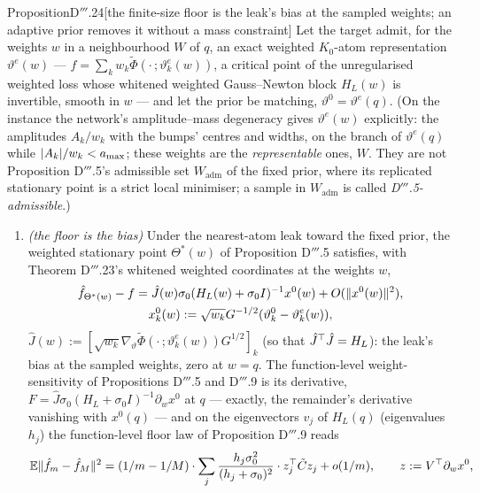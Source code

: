 \begin{thm}{Proposition}{D$'''$.24}[the finite-size floor is the leak's bias at the sampled weights; an adaptive prior
removes it without a mass constraint]\label{res:thmDppp:24}%
Let the target admit, for the weights $w$ in a neighbourhood $W$ of $q$, an exact weighted $K_0$-atom representation
$\vartheta^e(w)$ --- $f = \sum_kw_k\tilde\Phi(\cdot\,;\vartheta^e_k(w))$, a critical point of the unregularised
weighted loss whose whitened weighted Gauss--Newton block $H_L(w)$ is invertible, smooth in $w$ --- and let the prior
be matching, $\vartheta^0 = \vartheta^e(q)$. (On the instance the network's amplitude--mass degeneracy gives
$\vartheta^e(w)$ explicitly: the amplitudes $A_k/w_k$ with the bumps' centres and widths, on the branch of
$\vartheta^e(q)$ while $\lvert A_k\rvert/w_k < a_{\max}$; these weights are the \emph{representable} ones, $W$. They are not
Proposition D$'''$.5's admissible set $W_{\mathrm{adm}}$ of the fixed prior, where its replicated stationary point is a
strict local minimiser; a sample in $W_{\mathrm{adm}}$ is called \emph{D$'''$.5-admissible}.)
\begin{enumerate}[label=\textup{(\roman*)}]
  \item \emph{(the floor is the bias)} Under the nearest-atom leak toward the fixed prior, the weighted stationary
    point $\Theta^*(w)$ of Proposition D$'''$.5 satisfies, with Theorem D$'''$.23's whitened weighted coordinates at
    the weights $w$,
    \begin{gather*}
      \hat f_{\Theta^*(w)} - f = \hat J(w)\sigma_0(H_L(w) + \sigma_0I)^{-1}x^0(w) + O(\lVert x^0(w)\rVert^2),\\
      x^0_k(w) := \sqrt{w_k}G^{-1/2}(\vartheta^0_k - \vartheta^e_k(w)),
    \end{gather*}
    $\hat J(w) := [\sqrt{w_k}\nabla_\vartheta\tilde\Phi(\cdot\,;\vartheta^e_k(w))G^{1/2}]_k$ (so that
    $\hat J^\top\hat J = H_L$): the leak's bias at the sampled weights, zero at $w = q$. The function-level
    weight-sensitivity of Propositions D$'''$.5 and D$'''$.9 is its derivative,
    $F = \hat J\sigma_0(H_L + \sigma_0I)^{-1}\partial_wx^0$ at $q$ --- exactly, the remainder's derivative vanishing
    with $x^0(q)$ --- and on the eigenvectors $v_j$ of $H_L(q)$ (eigenvalues $h_j$) the function-level floor law of
    Proposition D$'''$.9 reads
    \begin{equation}
      \E\norm{\fhat_m - \fhat_M}^2 = (1/m - 1/M)\cdot\sum_j\frac{h_j\sigma_0^2}{(h_j + \sigma_0)^2}\cdot
      z_j^\T\tilde Cz_j + o(1/m),\qquad z := V^\T\partial_wx^0,

\end{equation}
\end{enumerate}
\end{thm}
